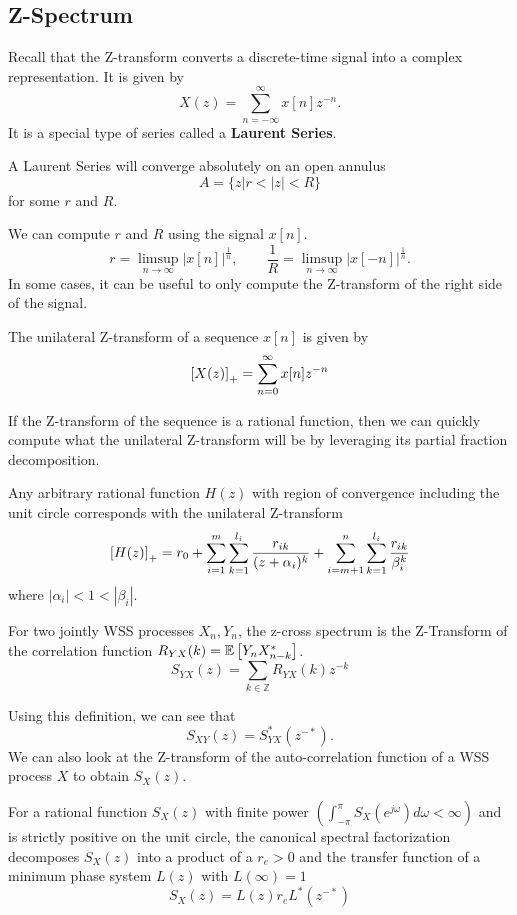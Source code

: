 \subsection{Z-Spectrum}
Recall that the Z-transform converts a discrete-time signal into a complex representation.
It is given by \[
	X(z) = \sum_{n=-\infty}^{\infty}x[n]z^{-n}.
\]
It is a special type of series called a \textbf{Laurent Series}.
\begin{theorem}
	A Laurent Series will converge absolutely on an open annulus \[
		A = \{z | r < |z| < R \}
	\] for some $r$ and $R$.
	\label{thm:z-transform-roc}
\end{theorem}
We can compute $r$ and $R$ using the signal $x[n]$.
\[
	r = \limsup_{n\to\infty} |x[n]|^{\frac{1}{n}}, \qquad \frac{1}{R} = \limsup_{n\to\infty}|x[-n]|^{\frac{1}{n}}.
\]
In some cases, it can be useful to only compute the Z-transform of the right side of the signal.
\begin{definition}
	The unilateral Z-transform of a sequence $x[n]$ is given by \[
		\left[X(z)\right]_+ = \sum_{n=0}^\infty x[n]z^{-n}
	\]
	\label{defn:unilateral-z-transform}
\end{definition}
If the Z-transform of the sequence is a rational function, then we can quickly compute what the unilateral Z-transform will be by leveraging its partial fraction decomposition.
\begin{theorem}
	Any arbitrary rational function	$H(z)$ with region of convergence including the unit circle corresponds with the unilateral Z-transform \[
		\left[H(z)\right]_+ = r_0 + \sum_{i=1}^m\sum_{k=1}^{l_i}\frac{r_{ik}}{(z+\alpha_i)^k} + \sum_{i=m+1}^n\sum_{k=1}^{l_i}\frac{r_{ik}}{\beta_i^k}
	\]
	where $|\alpha_i| < 1 < |\beta_i|$.
	\label{thm:unilateral-z}
\end{theorem}
\begin{definition}
	For two jointly WSS processes $X_n, Y_n$, the z-cross spectrum is the Z-Transform of the correlation function $R_{YX}(k) = \mathbb{E}\left[Y_nX^*_{n-k}\right]$.
	\[
		S_{YX}(z) = \sum_{k\in\mathbb{Z}}R_{YX}(k)z^{-k}
	\]
	\label{defn:z-cross-spectrum}
\end{definition}
Using this definition, we can see that \[
	S_{XY}(z) = S^*_{YX}(z^{-*}).
\]
We can also look at the Z-transform of the auto-correlation function of a WSS process $X$ to obtain $S_X(z)$.
\begin{definition}
	For a rational function $S_X(z)$ with finite power $\left(\int_{-\pi}^\pi S_X(e^{j\omega})d\omega < \infty \right)$ and is strictly positive on the unit circle, the canonical spectral factorization decomposes $S_X(z)$ into a product of a $r_e>0$ and the transfer function of a minimum phase system $L(z)$ with $L(\infty) = 1$ \[
		S_X(z) = L(z)r_eL^*(z^{-*})
	\]
	\label{defn:spectral-factorization}
\end{definition}
